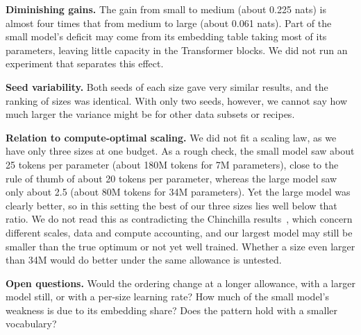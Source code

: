 \documentclass[11pt,a4paper]{article}
\begin{document}
\textbf{Diminishing gains.} The gain from small to medium (about 0.225 nats) is almost four times that from medium to large (about 0.061 nats). Part of the small model's deficit may come from its embedding table taking most of its parameters, leaving little capacity in the Transformer blocks. We did not run an experiment that separates this effect.

\textbf{Seed variability.} Both seeds of each size gave very similar results, and the ranking of sizes was identical. With only two seeds, however, we cannot say how much larger the variance might be for other data subsets or recipes.

\textbf{Relation to compute-optimal scaling.} We did not fit a scaling law, as we have only three sizes at one budget. As a rough check, the small model saw about 25 tokens per parameter (about 180M tokens for 7M parameters), close to the rule of thumb of about 20 tokens per parameter, whereas the large model saw only about 2.5 (about 80M tokens for 34M parameters). Yet the large model was clearly better, so in this setting the best of our three sizes lies well below that ratio. We do not read this as contradicting the Chinchilla results~\cite{Chin}, which concern different scales, data and compute accounting, and our largest model may still be smaller than the true optimum or not yet well trained. Whether a size even larger than 34M would do better under the same allowance is untested.

\textbf{Open questions.} Would the ordering change at a longer allowance, with a larger model still, or with a per-size learning rate? How much of the small model's weakness is due to its embedding share? Does the pattern hold with a smaller vocabulary?

\end{document}
